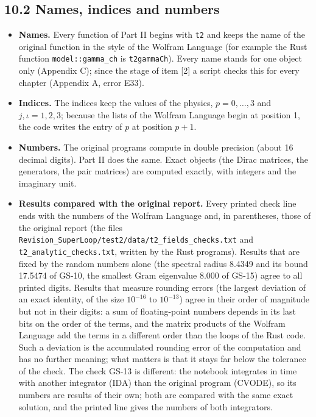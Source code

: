 \documentclass[
  10pt,
]{article}
\providecommand{\tightlist}{%
  \setlength{\itemsep}{0pt}\setlength{\parskip}{0pt}}
\begin{document}
\hypertarget{names-indices-and-numbers}{%
\subsection{10.2 Names, indices and
numbers}\label{names-indices-and-numbers}}

\begin{itemize}
\tightlist
\item
  \textbf{Names.} Every function of Part II begins with \texttt{t2} and
  keeps the name of the original function in the style of the Wolfram
  Language (for example the Rust function \texttt{model::gamma\_ch} is
  \texttt{t2gammaCh}). Every name stands for one object only (Appendix
  C); since the stage of item {[}2{]} a script checks this for every
  chapter (Appendix A, error E33).
\item
  \textbf{Indices.} The indices keep the values of the physics,
  \(p=0,\dots,3\) and \(j,\iota=1,2,3\); because the lists of the
  Wolfram Language begin at position 1, the code writes the entry of
  \(p\) at position \(p+1\).
\item
  \textbf{Numbers.} The original programs compute in double precision
  (about 16 decimal digits). Part II does the same. Exact objects (the
  Dirac matrices, the generators, the pair matrices) are computed
  exactly, with integers and the imaginary unit.
\item
  \textbf{Results compared with the original report.} Every printed
  check line ends with the numbers of the Wolfram Language and, in
  parentheses, those of the original report (the files
  \texttt{Revision\_SuperLoop/test2/data/t2\_fields\_checks.txt} and
  \texttt{t2\_analytic\_checks.txt}, written by the Rust programs).
  Results that are fixed by the random numbers alone (the spectral
  radius 8.4349 and its bound 17.5474 of GS-10, the smallest Gram
  eigenvalue 8.000 of GS-15) agree to all printed digits. Results that
  measure rounding errors (the largest deviation of an exact identity,
  of the size \(10^{-16}\) to \(10^{-13}\)) agree in their order of
  magnitude but not in their digits: a sum of floating-point numbers
  depends in its last bits on the order of the terms, and the matrix
  products of the Wolfram Language add the terms in a different order
  than the loops of the Rust code. Such a deviation is the accumulated
  rounding error of the computation and has no further meaning; what
  matters is that it stays far below the tolerance of the check. The
  check GS-13 is different: the notebook integrates in time with another
  integrator (IDA) than the original program (CVODE), so its numbers are
  results of their own; both are compared with the same exact solution,
  and the printed line gives the numbers of both integrators.
\end{itemize}
\end{document}
